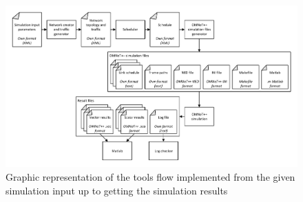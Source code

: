 \documentclass[conference]{IEEEtran}
\begin{document}
\begin{figure}[h]
	\centerline{\includegraphics[keepaspectratio=true, width=16cm] {figures/toolchain-architecture}}
	\caption{Graphic representation of the tools flow implemented from the given simulation input up to getting the simulation results}
	\label{fig:toolchain-architecture}
\end{figure}
\end{document}
